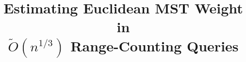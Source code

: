 \documentclass[11pt]{article}
\title{Estimating Euclidean MST Weight in\\ $\widetilde{O}(n^{1/3})$ Range-Counting Queries}
\author{}
\date{}
\theoremstyle{plain}
\theoremstyle{definition}
\theoremstyle{plain}
\begin{document}
\maketitle

\begin{abstract}

\end{abstract}













\appendix



\end{document}
